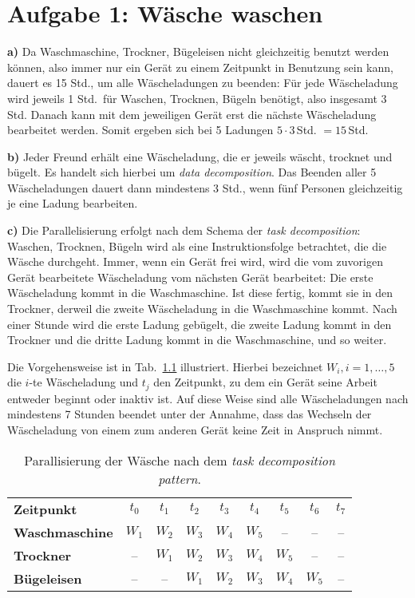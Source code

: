 \chapter{Aufgabe 1: Wäsche waschen}

\textbf{a)} Da Waschmaschine, Trockner, Bügeleisen nicht gleichzeitig benutzt werden können, also immer nur ein Gerät zu einem Zeitpunkt in Benutzung sein kann, dauert es 15 Std., um alle Wäscheladungen zu beenden: Für jede Wäscheladung wird jeweils 1 Std.~für Waschen, Trocknen, Bügeln benötigt, also insgesamt 3 Std. Danach kann mit dem jeweiligen Gerät erst die nächste Wäscheladung bearbeitet werden. Somit ergeben sich bei 5 Ladungen $5\cdot3\,$Std. $= 15\,$Std.\medskip  

\textbf{b)} Jeder Freund erhält eine Wäscheladung, die er jeweils wäscht, trocknet und bügelt. Es handelt sich hierbei um \emph{data decomposition}. Das Beenden aller 5 Wäscheladungen dauert dann mindestens 3 Std., wenn fünf Personen gleichzeitig je eine Ladung bearbeiten.\medskip 

\textbf{c)} Die Parallelisierung erfolgt nach dem Schema der \emph{task decomposition}: Waschen, Trocknen, Bügeln wird als eine Instruktionsfolge betrachtet, die die Wäsche durchgeht. Immer, wenn ein Gerät frei wird, wird die vom zuvorigen Gerät bearbeitete Wäscheladung vom nächsten Gerät bearbeitet: Die erste Wäscheladung kommt in die Waschmaschine. Ist diese fertig, kommt sie in den Trockner, derweil die zweite Wäscheladung in die Waschmaschine kommt. Nach einer Stunde wird die erste Ladung gebügelt, die zweite Ladung kommt in den Trockner und die dritte Ladung kommt in die Waschmaschine, und so weiter.

Die Vorgehensweise ist in Tab.~\ref{tab:taskdecomposition} illustriert. Hierbei bezeichnet $W_i, i = 1,\dots,5$ die $i$-te Wäscheladung und $t_j$ den Zeitpunkt, zu dem ein Gerät seine Arbeit entweder beginnt oder inaktiv ist. Auf diese Weise sind alle Wäscheladungen nach mindestens 7 Stunden beendet unter der Annahme, dass das Wechseln der Wäscheladung von einem zum anderen Gerät keine Zeit in Anspruch nimmt.

\begin{table}[h]
 \centering 
 \caption{Parallisierung der Wäsche nach dem \emph{task decomposition pattern}.}
 \begin{tabular}{l|c|c|c|c|c|c|c|c|}
  \textbf{Zeitpunkt} & $t_0$ & $t_1$ & $t_2$ & $t_3$ & $t_4$ & $t_5$ & $t_6$ & $t_7$ \\ 
  \textbf{Waschmaschine} & $W_1$ & $W_2$ & $W_3$ & $W_4$ & $W_5$ & -- & -- & -- \\ 
  \textbf{Trockner} & -- & $W_1$ & $W_2$ & $W_3$ & $W_4$ & $W_5$ & -- & -- \\
  \textbf{Bügeleisen} & -- & -- & $W_1$ & $W_2$ & $W_3$ & $W_4$ & $W_5$ & -- \\
 \end{tabular}
 \label{tab:taskdecomposition}
\end{table}
